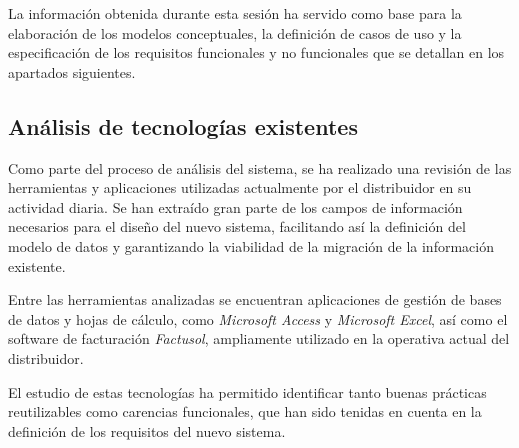 La información obtenida durante esta sesión ha servido como base para la elaboración de los modelos conceptuales, la definición de casos de uso y la especificación de los requisitos funcionales y no funcionales que se detallan en los apartados siguientes.

\subsection{Análisis de tecnologías existentes}

Como parte del proceso de análisis del sistema, se ha realizado una revisión de las herramientas y aplicaciones utilizadas actualmente por el distribuidor en su actividad diaria. Se han extraído gran parte de los campos de información necesarios para el diseño del nuevo sistema, facilitando así la definición del modelo de datos y garantizando la viabilidad de la migración de la información existente.

Entre las herramientas analizadas se encuentran aplicaciones de gestión de bases de datos y hojas de cálculo, como \textit{Microsoft Access} y \textit{Microsoft Excel}, así como el software de facturación \textit{Factusol}, ampliamente utilizado en la operativa actual del distribuidor.

El estudio de estas tecnologías ha permitido identificar tanto buenas prácticas reutilizables como carencias funcionales, que han sido tenidas en cuenta en la definición de los requisitos del nuevo sistema.